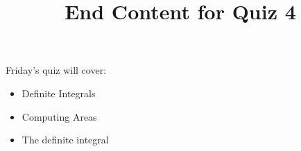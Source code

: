 \documentclass{ximera}
\title{End Content for Quiz 4}
\begin{document}
\begin{abstract}
\end{abstract}

\maketitle

\begin{sectionOutcomes}

Friday's quiz will cover:





\begin{itemize}
\item Definite Integrals
\item Computing Areas
\item The definite integral
\end{itemize}


\end{sectionOutcomes}
\end{document}
